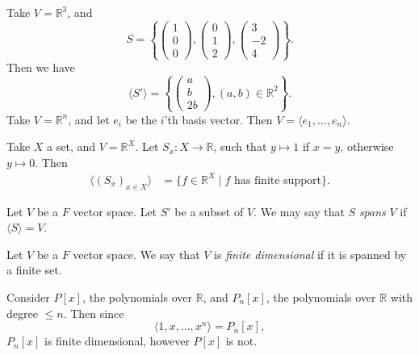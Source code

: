 \documentclass[12pt]{article}
\begin{document}
\begin{exbox}
	Take $V = \mathbb{R}^3$, and
	\[
	S = \left\{
		\begin{pmatrix}
			1 \\
			0 \\
			0
		\end{pmatrix}
		,
		\begin{pmatrix}
			0 \\
			1\\
			2
		\end{pmatrix}
		,
		\begin{pmatrix}
			3 \\
			-2 \\
			4
		\end{pmatrix}
	\right\}
	.\]
	Then we have
	\[
		\langle S' \rangle = \left\{
			\begin{pmatrix}
				a \\
				b \\
				2b
			\end{pmatrix}
			,
		(a, b) \in \mathbb{R}^2\right\}
	.\]
	Take $V = \mathbb{R}^{n}$, and let $e_i$ be the $i$'th basis vector. Then $V = \langle e_1, \ldots, e_n \rangle$.

	Take $X$ a set, and $V = \mathbb{R}^{X}$. Let $S_x : X \to \mathbb{R}$, such that $y \mapsto 1$ if $x = y$, otherwise $y \mapsto 0$. Then
	\begin{align*}
		\langle (S_x)_{x \in X} \rangle &= \{f \in \mathbb{R}^{X} \mid f \text{ has finite support}\}.
	\end{align*}
\end{exbox}

\begin{definition}
	Let $V$ be a $F$ vector space. Let $S'$ be a subset of $V$. We may say that $S$ \textit{spans} $V$ if $\langle S \rangle = V$.
\end{definition}

\begin{definition}
	Let $V$ be a $F$ vector space. We say that $V$ is \textit{finite dimensional} if it is spanned by a finite set.
\end{definition}

\begin{exbox}
	Consider $P[x]$, the polynomials over $\mathbb{R}$, and $P_n[x]$, the polynomials over $\mathbb{R}$ with degree $\leq n$. Then since
	\[
		\langle 1, x, \ldots, x^{n}\rangle = P_n[x]
	,\]
	$P_n[x]$ is finite dimensional, however $P[x]$ is not.
\end{exbox}
\end{document}
